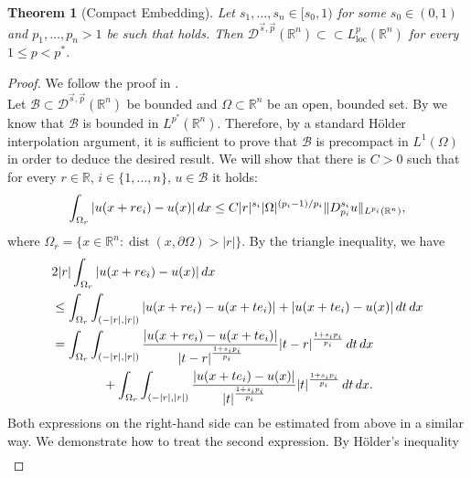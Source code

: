 \documentclass[11pt]{amsart}
\theoremstyle{plain}
\newtheorem{theorem}{Theorem}[section]
\theoremstyle{definition}
\numberwithin{equation}{section}
\renewcommand{\d}{\textnormal{d}}
\newcommand{\R}{\mathbb{R}}
\newcommand{\Dsp}{\mathcal{D}^{\vec{s},\vec{p}}(\mathbb{R}^n)}
\DeclareMathOperator{\dist}{dist}
\begin{document}
\begin{theorem}[Compact Embedding] \label{thm:compemb}
Let $s_1,\dots,s_n\in[s_0,1)$ for some $s_0\in(0,1)$ and $p_1,\dots,p_n>1$ be such that  holds. Then
$\Dsp \subset\subset L^{p}_{\mathrm{loc}}(\R^n)$ for every $1 \le p < p^{\ast}$.
\end{theorem}

\begin{proof}
We follow the proof in \cite[Theorem 4.54]{DD12}.\\
Let $\mathcal{B} \subset \Dsp$ be bounded and $\Omega \subset \R^n$ be an open, bounded set. By  we know that $\mathcal{B}$ is bounded in $L^{p^{\ast}}(\R^n)$. Therefore, by a standard H\"older interpolation argument, it is sufficient to prove that $\mathcal{B}$ is precompact in $L^1(\Omega)$ in order to deduce the desired result. We will show that there is $C > 0$ such that for every $r \in \R$, $i \in \{1,\dots,n\}$, $u \in \mathcal{B}$ it holds:
\begin{equation}
\label{eq:compembHelp1}
\int_{\Omega_r} \vert u(x+r e_i) - u(x) \vert\,  \d x \le C \vert r \vert^{s_i} \vert \Omega \vert^{(p_i-1)/p_i} \Vert D^{s_i}_{p_i} u \Vert_{L^{p_i}(\R^n)},
\end{equation}
where $\Omega_r = \{ x \in \R^n : \dist(x,\partial \Omega) > \vert r\vert \}$.
By the triangle inequality, we have
\begin{equation*}
\begin{split}
&2\vert r\vert \int_{\Omega_r} \vert u(x+r e_i) - u(x) \vert \, \d x \\
& \le \int_{\Omega_r} \int_{(-\vert r\vert,\vert r \vert)}\vert u(x+r e_i) - u(x+t e_i) \vert + \vert u(x+te_i) - u(x) \vert \, \d t \, \d x  \\
&= \int_{\Omega_r} \int_{(-\vert r\vert,\vert r\vert)}\frac{\vert u(x+r e_i) - u(x+t e_i) \vert}{\vert t-r\vert^{\frac{1+s_ip_i}{p_i}}} \vert t-r\vert^{\frac{1+s_ip_i}{p_i}} \, \d t \, \d x \\
& \qquad\qquad+ \int_{\Omega_r} \int_{(-\vert r \vert,\vert r\vert)} \frac{\vert u(x+te_i) - u(x) \vert}{\vert t \vert^{\frac{1+s_ip_i}{p_i}}} \vert t \vert^{\frac{1+s_ip_i}{p_i}}\, \d t \, \d x.
\end{split}
\end{equation*}
Both expressions on the right-hand side can be estimated from above in a similar way. We demonstrate how to treat the second expression. 
By H\"older's inequality
\begin{equation*}
\begin{split}

\end{split}
\end{equation*}
\end{proof}
\end{document}
